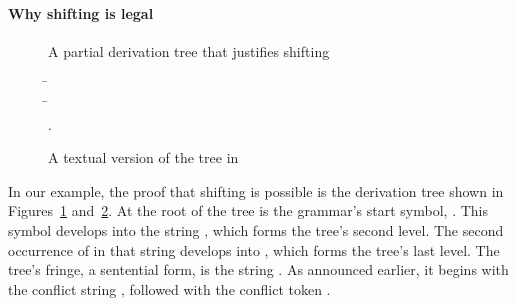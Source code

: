 \documentclass[onecolumn,11pt,nocopyrightspace,preprint]{sigplanconf}
\newenvironment{heveapicture}{
\begin{toimage}
}{
\end{toimage}
\imageflush{}
}
\begin{document}
\paragraph{Why shifting is legal}

\begin{figure}
\mycommonbaseline
\begin{center}
\begin{heveapicture}
\end{heveapicture}
\end{center}
\caption{A partial derivation tree that justifies shifting}
\label{fig:shifting:tree}
\end{figure}

\begin{figure}
\begin{center}
\begin{tabbing}
\=  \\
\>    \=  \\
\>                                         \>    
                                              .  
\end{tabbing}
\end{center}
\caption{A textual version of the tree in }
\label{fig:shifting:text}
\end{figure}

In our example, the proof that shifting is possible is the derivation tree
shown in Figures~\ref{fig:shifting:tree} and~\ref{fig:shifting:text}. At the
root of the tree is the grammar's start symbol, . This symbol
develops into the string , which forms the
tree's second level. The second occurrence of  in that string
develops into , which forms
the tree's last level. The tree's fringe, a sentential form, is the string
. As
announced earlier, it begins with the conflict string , followed with the conflict token
.
\end{document}
